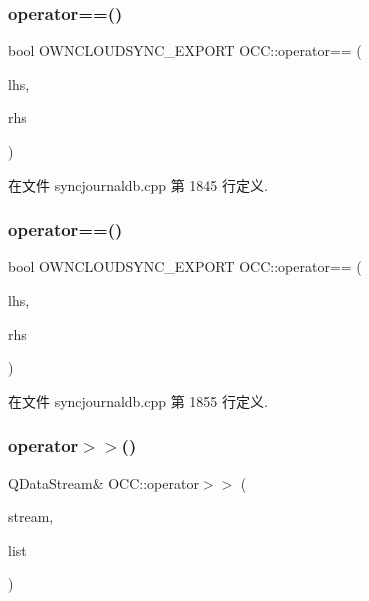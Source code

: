 \subsubsection{\texorpdfstring{operator==()}{operator==()}\hspace{0.1cm}{\footnotesize\ttfamily [3/4]}}
{\footnotesize\ttfamily bool O\+W\+N\+C\+L\+O\+U\+D\+S\+Y\+N\+C\+\_\+\+E\+X\+P\+O\+RT O\+C\+C\+::operator== (\begin{DoxyParamCaption}\item[{const \hyperlink{struct_o_c_c_1_1_sync_journal_db_1_1_download_info}{Sync\+Journal\+Db\+::\+Download\+Info} \&}]{lhs,  }\item[{const \hyperlink{struct_o_c_c_1_1_sync_journal_db_1_1_download_info}{Sync\+Journal\+Db\+::\+Download\+Info} \&}]{rhs }\end{DoxyParamCaption})}



在文件 syncjournaldb.\+cpp 第 1845 行定义.

\mbox{\label{namespace_o_c_c_a294d9a31b5733f4eff3b432a389e894e}} 
\subsubsection{\texorpdfstring{operator==()}{operator==()}\hspace{0.1cm}{\footnotesize\ttfamily [4/4]}}
{\footnotesize\ttfamily bool O\+W\+N\+C\+L\+O\+U\+D\+S\+Y\+N\+C\+\_\+\+E\+X\+P\+O\+RT O\+C\+C\+::operator== (\begin{DoxyParamCaption}\item[{const \hyperlink{struct_o_c_c_1_1_sync_journal_db_1_1_upload_info}{Sync\+Journal\+Db\+::\+Upload\+Info} \&}]{lhs,  }\item[{const \hyperlink{struct_o_c_c_1_1_sync_journal_db_1_1_upload_info}{Sync\+Journal\+Db\+::\+Upload\+Info} \&}]{rhs }\end{DoxyParamCaption})}



在文件 syncjournaldb.\+cpp 第 1855 行定义.

\mbox{\label{namespace_o_c_c_ad2580b093e189164c924e8c93f992afb}} 
\subsubsection{\texorpdfstring{operator$>$$>$()}{operator>>()}}
{\footnotesize\ttfamily Q\+Data\+Stream\& O\+C\+C\+::operator$>$$>$ (\begin{DoxyParamCaption}\item[{Q\+Data\+Stream \&}]{stream,  }\item[{Q\+List$<$ Q\+Network\+Cookie $>$ \&}]{list }\end{DoxyParamCaption})}




